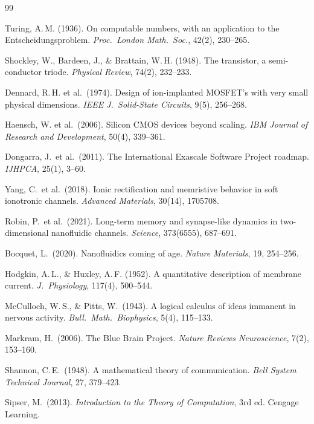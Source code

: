 ﻿\documentclass[a4paper,12pt]{article}
\theoremstyle{plain}
\theoremstyle{definition}
\theoremstyle{remark}
\begin{document}
\begin{thebibliography}{99}

Turing, A.\,M. (1936).
On computable numbers, with an application to the Entscheidungsproblem.
\textit{Proc.\ London Math.\ Soc.}, 42(2), 230--265.

Shockley, W., Bardeen, J., \& Brattain, W.\,H. (1948).
The transistor, a semi-conductor triode.
\textit{Physical Review}, 74(2), 232--233.

Dennard, R.\,H. et al.\ (1974).
Design of ion-implanted MOSFET's with very small physical dimensions.
\textit{IEEE J.\ Solid-State Circuits}, 9(5), 256--268.

Haensch, W. et al.\ (2006).
Silicon CMOS devices beyond scaling.
\textit{IBM Journal of Research and Development}, 50(4), 339--361.

Dongarra, J.\ et al.\ (2011).
The International Exascale Software Project roadmap.
\textit{IJHPCA}, 25(1), 3--60.

Yang, C.\ et al.\ (2018).
Ionic rectification and memristive behavior in soft ionotronic channels.
\textit{Advanced Materials}, 30(14), 1705708.

Robin, P.\ et al.\ (2021).
Long-term memory and synapse-like dynamics in two-dimensional nanofluidic channels.
\textit{Science}, 373(6555), 687--691.

Bocquet, L.\ (2020).
Nanofluidics coming of age.
\textit{Nature Materials}, 19, 254--256.

Hodgkin, A.\,L., \& Huxley, A.\,F. (1952).
A quantitative description of membrane current.
\textit{J.\ Physiology}, 117(4), 500--544.

McCulloch, W.\,S., \& Pitts, W.\ (1943).
A logical calculus of ideas immanent in nervous activity.
\textit{Bull.\ Math.\ Biophysics}, 5(4), 115--133.

Markram, H.\ (2006).
The Blue Brain Project.
\textit{Nature Reviews Neuroscience}, 7(2), 153--160.

Shannon, C.\,E.\ (1948).
A mathematical theory of communication.
\textit{Bell System Technical Journal}, 27, 379--423.

Sipser, M.\ (2013).
\textit{Introduction to the Theory of Computation}, 3rd ed.
Cengage Learning.


\end{thebibliography}
\end{document}
